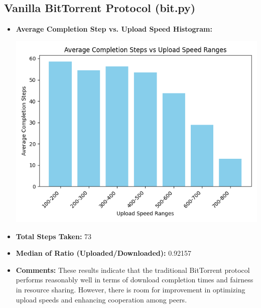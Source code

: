 \documentclass{article}
\begin{document}
\subsection{Vanilla BitTorrent Protocol (bit.py)}
\begin{itemize}
\item \textbf{Average Completion Step vs. Upload Speed Histogram:}

\includegraphics[width=\linewidth]{graphs/bit.png}
\item \textbf{Total Steps Taken:} 73
\item \textbf{Median of Ratio (Uploaded/Downloaded):} 0.92157
\item \textbf{Comments:} These results indicate that the traditional BitTorrent protocol performs reasonably well in terms of download completion times and fairness in resource sharing. However, there is room for improvement in optimizing upload speeds and enhancing cooperation among peers.
\end{itemize}
\newpage
\end{document}
